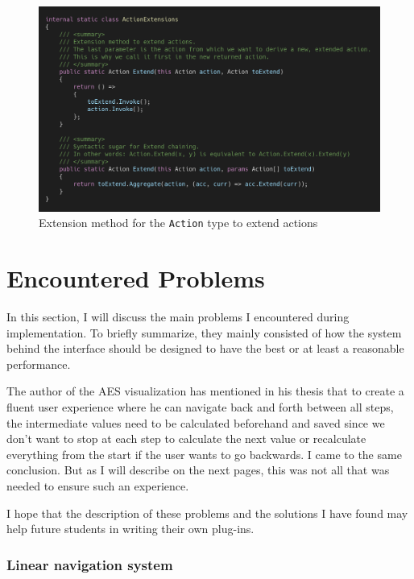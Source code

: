 \begin{figure}
\centering
\includegraphics[width=\textwidth]{figures/code/nav-arch/action-extensions.png}
\caption[Extending \texttt{Action} type]{Extension method for the \texttt{Action} type to extend actions}
\label{fig:navsystem.sequences.extension}
\end{figure}


\pagebreak

\section{Encountered Problems}
\label{sec:encounteredProblems}

In this section, I will discuss the main problems I encountered during implementation. To briefly summarize, they mainly consisted of how the system behind the interface should be designed to have the best or at least a reasonable performance.

The author of the AES visualization has mentioned in his thesis that to create a fluent user experience where he can navigate back and forth between all steps, the intermediate values need to be calculated beforehand and saved since we don't want to stop at each step to calculate the next value or recalculate everything from the start if the user wants to go backwards. I came to the same conclusion. But as I will describe on the next pages, this was not all that was needed to ensure such an experience.

I hope that the description of these problems and the solutions I have found may help future students in writing their own plug-ins.

\subsubsection{Linear navigation system}

